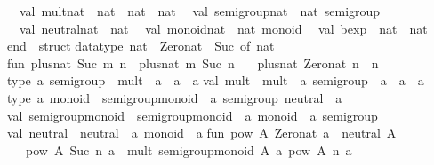 \begin{isabellebody}
\begin{isamarkuptext}
\ \ val\ mult{\isacharunderscore}nat\ {\isacharcolon}\ nat\ {\isacharminus}{\isachargreater}\ nat\ {\isacharminus}{\isachargreater}\ nat\isanewline
\ \ val\ semigroup{\isacharunderscore}nat\ {\isacharcolon}\ nat\ semigroup\isanewline
\ \ val\ neutral{\isacharunderscore}nat\ {\isacharcolon}\ nat\isanewline
\ \ val\ monoid{\isacharunderscore}nat\ {\isacharcolon}\ nat\ monoid\isanewline
\ \ val\ bexp\ {\isacharcolon}\ nat\ {\isacharminus}{\isachargreater}\ nat\isanewline
end\ {\isacharequal}\ struct\isanewline
\isanewline
datatype\ nat\ {\isacharequal}\ Zero{\isacharunderscore}nat\ {\isacharbar}\ Suc\ of\ nat{\isacharsemicolon}\isanewline
\isanewline
fun\ plus{\isacharunderscore}nat\ {\isacharparenleft}Suc\ m{\isacharparenright}\ n\ {\isacharequal}\ plus{\isacharunderscore}nat\ m\ {\isacharparenleft}Suc\ n{\isacharparenright}\isanewline
\ \ {\isacharbar}\ plus{\isacharunderscore}nat\ Zero{\isacharunderscore}nat\ n\ {\isacharequal}\ n{\isacharsemicolon}\isanewline
\isanewline
type\ {\isacharprime}a\ semigroup\ {\isacharequal}\ {\isacharbraceleft}mult\ {\isacharcolon}\ {\isacharprime}a\ {\isacharminus}{\isachargreater}\ {\isacharprime}a\ {\isacharminus}{\isachargreater}\ {\isacharprime}a{\isacharbraceright}{\isacharsemicolon}\isanewline
val\ mult\ {\isacharequal}\ {\isacharhash}mult\ {\isacharcolon}\ {\isacharprime}a\ semigroup\ {\isacharminus}{\isachargreater}\ {\isacharprime}a\ {\isacharminus}{\isachargreater}\ {\isacharprime}a\ {\isacharminus}{\isachargreater}\ {\isacharprime}a{\isacharsemicolon}\isanewline
\isanewline
type\ {\isacharprime}a\ monoid\ {\isacharequal}\ {\isacharbraceleft}semigroup{\isacharunderscore}monoid\ {\isacharcolon}\ {\isacharprime}a\ semigroup{\isacharcomma}\ neutral\ {\isacharcolon}\ {\isacharprime}a{\isacharbraceright}{\isacharsemicolon}\isanewline
val\ semigroup{\isacharunderscore}monoid\ {\isacharequal}\ {\isacharhash}semigroup{\isacharunderscore}monoid\ {\isacharcolon}\ {\isacharprime}a\ monoid\ {\isacharminus}{\isachargreater}\ {\isacharprime}a\ semigroup{\isacharsemicolon}\isanewline
val\ neutral\ {\isacharequal}\ {\isacharhash}neutral\ {\isacharcolon}\ {\isacharprime}a\ monoid\ {\isacharminus}{\isachargreater}\ {\isacharprime}a{\isacharsemicolon}\isanewline
\isanewline
fun\ pow\ A{\isacharunderscore}\ Zero{\isacharunderscore}nat\ a\ {\isacharequal}\ neutral\ A{\isacharunderscore}\isanewline
\ \ {\isacharbar}\ pow\ A{\isacharunderscore}\ {\isacharparenleft}Suc\ n{\isacharparenright}\ a\ {\isacharequal}\ mult\ {\isacharparenleft}semigroup{\isacharunderscore}monoid\ A{\isacharunderscore}{\isacharparenright}\ a\ {\isacharparenleft}pow\ A{\isacharunderscore}\ n\ a{\isacharparenright}{\isacharsemicolon}\isanewline

\end{isamarkuptext}
\end{isabellebody}
